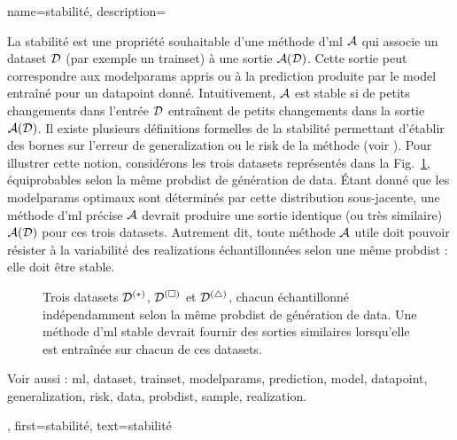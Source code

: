 {name={stabilité},
	description={La stabilité est une propriété souhaitable d’une méthode d’\gls{ml} $\mathcal{A}$ 
		qui associe un \gls{dataset} $\mathcal{D}$ (par exemple un \gls{trainset}) à une sortie $\mathcal{A}(\mathcal{D})$. 
		Cette sortie peut correspondre aux \glspl{modelparam} appris ou à la \gls{prediction} produite par 
		le \gls{model} entraîné pour un \gls{datapoint} donné. Intuitivement, $\mathcal{A}$ est stable si 
		de petits changements dans l’entrée $\mathcal{D}$ entraînent de petits changements dans la sortie 
		$\mathcal{A}(\mathcal{D})$. Il existe plusieurs définitions formelles de la stabilité permettant d’établir 
		des bornes sur l’erreur de \gls{generalization} ou le \gls{risk} de la méthode (voir \cite[Ch.~13]{ShalevMLBook}).
		Pour illustrer cette notion, considérons les trois \glspl{dataset} représentés dans la 
		Fig.~\ref{fig_three_data_stability_dict}, équiprobables selon la même \gls{probdist} de génération de \gls{data}. Étant donné que les \glspl{modelparam} optimaux sont déterminés par cette distribution 
		sous-jacente, une méthode d’\gls{ml} précise $\mathcal{A}$ devrait produire une sortie identique (ou très 
		similaire) $\mathcal{A}(\mathcal{D})$ pour ces trois \glspl{dataset}. Autrement dit, toute méthode 
		$\mathcal{A}$ utile doit pouvoir résister à la variabilité des \glspl{realization} échantillonnées selon une même 
		\gls{probdist} : elle doit être stable.
		\begin{figure}[H]
			\centering
			\caption{Trois \glspl{dataset} $\mathcal{D}^{(*)}$, $\mathcal{D}^{(\square)}$ et $\mathcal{D}^{(\triangle)}$, 
				chacun échantillonné indépendamment selon la même \gls{probdist} de génération de \gls{data}. 
				Une méthode d’\gls{ml} stable devrait fournir des sorties similaires lorsqu’elle est entraînée sur 
				chacun de ces \glspl{dataset}. \label{fig_three_data_stability_dict}}
		\end{figure}		
		Voir aussi : \gls{ml}, \gls{dataset}, \gls{trainset}, \glspl{modelparam}, \gls{prediction}, \gls{model}, \gls{datapoint}, \gls{generalization}, \gls{risk}, \gls{data}, \gls{probdist}, \gls{sample}, \gls{realization}.}, 
	first={stabilité}, 
	text={stabilité} 
}

